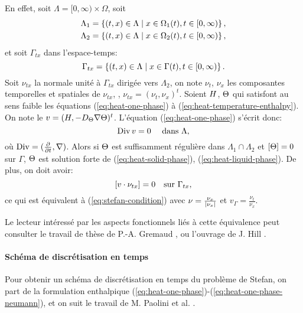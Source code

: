 En effet, soit $\Lambda = [0, \infty)\times \Omega$, soit
\begin{align}
  & \Lambda_1 = \left\{ (t, x)\in\Lambda\mid x \in \Omega_1(t), t \in
  [0,\infty) \right\},\\
  & \Lambda_2 = \left\{ (t, x)\in\Lambda\mid x \in \Omega_2(t), t \in
  [0,\infty) \right\},\\
\end{align}
et soit $\Gamma_{tx}$ dans l'espace-temps:
\begin{equation}
  \Gamma_{tx} = \left\{ (t, x) \in \Lambda\mid x \in \Gamma(t), t \in
  [0,\infty) \right\}.
\end{equation}
Soit $\nu_{tx}$ la normale unité à $\Gamma_{tx}$ dirigée vers
$\Lambda_2$, on note $\nu_t$, $\nu_x$ les composantes temporelles et
spatiales de $\nu_{tx}$, \ie, $\nu_{tx} = (\nu_t, \nu_x)^t$. Soient
$H$, $\Theta$ qui satisfont au sens faible les équations
(\ref{eq:heat-one-phase}) à (\ref{eq:heat-temperature-enthalpy}). On
note le $v = (H, -D_\Theta\nabla
\Theta)^t$. L'équation (\ref{eq:heat-one-phase}) s'écrit donc:
\begin{equation}\label{eq:space-time-divergence}
  \operatorname{Div} v = 0 \quad\text{ dans }\Lambda,
\end{equation}
où $\operatorname{Div} = (\frac{\partial}{\partial t}, \nabla)$. Alors si
$\Theta$ est suffisamment régulière dans
$\Lambda_1\cap\Lambda_2$ et $\left[ \Theta \right] = 0$ sur $\Gamma$, $\Theta$ est solution forte de
(\ref{eq:heat-solid-phase}), (\ref{eq:heat-liquid-phase}). De plus,
on doit avoir:
\begin{equation}
  \left[ v\cdot \nu_{tx} \right] = 0 \quad \text{sur } \Gamma_{tx},
\end{equation}
ce qui est équivalent à (\ref{eq:stefan-condition}) avec $\nu =
\frac{\nu_x}{\left\lvert \nu_x \right\rvert}$ et $v_\Gamma = \frac{\nu_t}{\nu_x}$.

Le lecteur intéressé par les aspects fonctionnels liés à cette
équivalence peut consulter le travail de thèse de
P.-A. Gremaud \cite{Gremaud1991}, ou l'ouvrage de J. Hill
\cite{HillStefanProblems}.

\paragraph{Schéma de discrétisation en temps}
Pour obtenir un schéma de discrétisation en temps du problème de
Stefan, on part de la formulation enthalpique
(\ref{eq:heat-one-phase})-(\ref{eq:heat-one-phase-neumann}), et on
suit le travail de M. Paolini et al. \cite{Paolini1988}.

